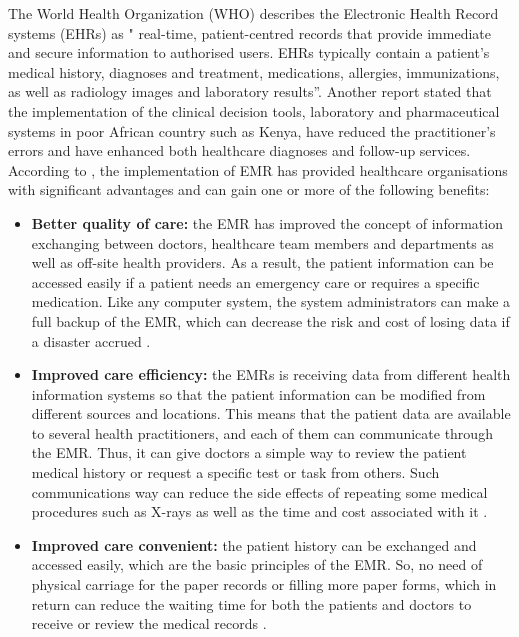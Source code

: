 The World Health Organization (WHO) \cite{WorldHealthOrganization2016} describes the Electronic Health Record systems (EHRs) as " real-time, patient-centred records that provide immediate and secure information to authorised users. EHRs typically contain a patient's medical history, diagnoses and treatment, medications, allergies, immunizations, as well as radiology images and laboratory results”. Another report \cite{WorldHealthOrganization2013} stated that the implementation of the clinical decision tools, laboratory and pharmaceutical systems in poor African country such as Kenya, have reduced the practitioner's errors and have enhanced both healthcare diagnoses and follow-up services. According to \cite{OfHealth}, the implementation of EMR has provided healthcare organisations with significant advantages and can gain one or more of the following benefits:
\begin{itemize}
	\item \textbf{Better quality of care:} the EMR has improved the concept of information exchanging between doctors, healthcare team members and departments as well as off-site health providers. As a result, the patient information can be accessed easily if a patient needs an emergency care or requires a specific medication. Like any computer system, the system administrators can make a full backup of the EMR, which can decrease the risk and cost of losing data if a disaster accrued \cite{OfHealth}.
	\item \textbf{Improved care efficiency:} the EMRs is receiving data from different health information systems so that the patient information can be modified from different sources and locations. This means that the patient data are available to several health practitioners, and each of them can communicate through the EMR. Thus, it can give doctors a simple way to review the patient medical history or request a specific test or task from others. Such communications way can reduce the side effects of repeating some medical procedures such as X-rays as well as the time and cost associated with it   \cite{OfHealth}. 
	\item \textbf{Improved care convenient:} the patient history can be exchanged and accessed easily, which are the basic principles of the EMR. So, no need of physical carriage for the paper records or filling more paper forms, which in return can reduce the waiting time for both the patients and doctors to receive or review the medical records  \cite{OfHealth}.
\end{itemize}


